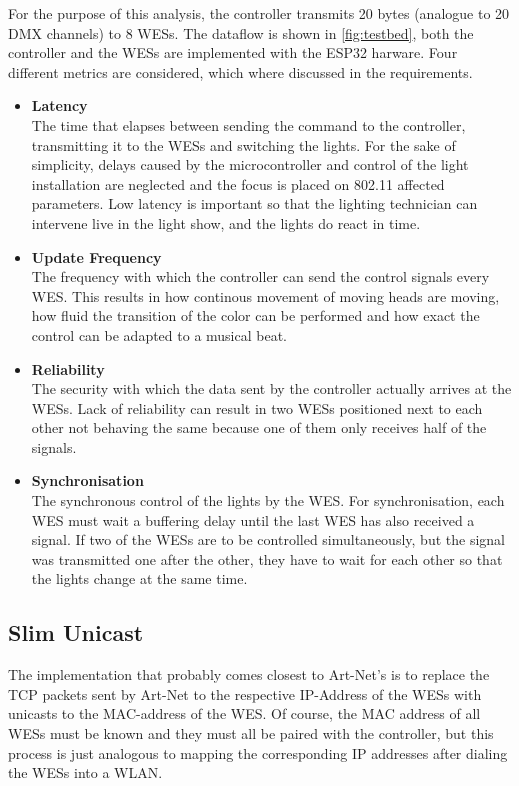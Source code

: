 For the purpose of this analysis, the controller transmits 20 bytes (analogue to 20 DMX channels) to 8 WESs.
The dataflow is shown in \cref{fig:testbed}, 
both the controller and the WESs are implemented with the ESP32 harware.
Four different metrics are considered, which where discussed in the requirements.
\begin{itemize}
	\item \textbf{Latency} \\
	The time that elapses between sending the command to the controller, 
	transmitting it to the WESs and switching the lights.
	For the sake of simplicity, delays caused by the microcontroller and
	control of the light installation are neglected and the focus is placed on 802.11 affected parameters.
	Low latency is important so that the lighting technician can intervene live in the light show,
	and the lights do react in time.
	\item \textbf{Update Frequency}\\
	The frequency with which the controller can send the control signals every WES.
	This results in 
	how continous movement of moving heads are moving,
	how fluid the transition of the color can be performed and
	how exact the control can be adapted to a musical beat.
	\item \textbf{Reliability}\\
	The security with which the data sent by the controller actually arrives at the \ac{WES}s.
	Lack of reliability can result 
	in two WESs positioned next to each other not behaving the same because one of them only receives half of the signals.
	\item \textbf{Synchronisation}\\
	The synchronous control of the lights by the WES.
	For synchronisation, each WES must wait a buffering delay until the last WES has also received a signal.
	If two of the WESs are to be controlled simultaneously, 
	but the signal was transmitted one after the other, 
	they have to wait for each other so that the lights change at the same time.
\end{itemize}

\subsection*{Slim Unicast}

The implementation that probably comes closest to Art-Net's is to replace the TCP packets sent by Art-Net 
to the respective IP-Address of the WESs with unicasts to the MAC-address of the WES.
Of course, the MAC address of all WESs must be known and they must all be paired with the controller, but 
this process is just analogous to  mapping the corresponding IP addresses after dialing the WESs into a WLAN.

